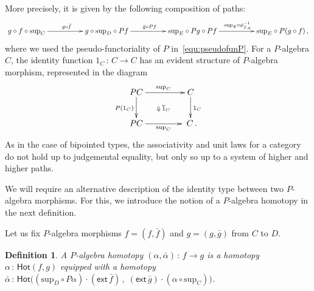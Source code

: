 \documentclass[10pt,a4paper,oneside,reqno]{amsart}
\numberwithin{equation}{section}
\theoremstyle{mythm}
\theoremstyle{mydef}
\newtheorem{definition}[theorem]{Definition}
\theoremstyle{myrmk}
\newcommand{\co}{\,{:}\,}
\newcommand{\ct}{\cdot}
\newcommand{\Hot}{\mathsf{Hot}}
\newcommand{\ext}{\mathsf{ext}}
\renewcommand{\sup}{\mathrm{sup}}
\begin{document}
More precisely, it is given by the following composition of paths:
\[
\xymatrix@C=1.7cm{
g \circ f \circ \sup_C \ar[r]^{g \circ \bar{f}} & 
g \circ \sup_D \circ Pf \ar[r]^{\bar{g} \circ Pf} & 
\sup_E \circ Pg \circ Pf \ar[r]^{\sup_E \circ \phi_{f,g}^{-1}} &
\sup_E \circ P(g \circ f) \, ,}
\]
where we used the pseudo-functoriality of $P$ in~\eqref{equ:pseudofunP}. 
For a $P$-algebra $C$,  the identity function $1_C \co C \to C$ has an evident structure of $P$-algebra morphism,
represented in the diagram
\begin{equation}
\label{equ:palgid}
\xymatrix@C=1.5cm{
PC \ar[d]_{P(1_C)}  \ar[r]^{\sup_C} \ar@{}[dr]|{\Downarrow \, \overline{1}_C} & C \ar[d]^{1_C} \\
PC \ar[r]_{\sup_C} & \; C \, .}
\end{equation}
As in the case of bipointed types, the associativity and unit laws for a category do not hold up to judgemental equality, but only so up to a system of higher and higher paths.

\medskip

We will require an alternative description of the identity type between two $P$-algebra morphisms. For this, we introduce  the notion of a $P$-algebra homotopy in the next definition.

\medskip

Let us fix $P$-algebra morphisms $f = (f, \bar{f})$ and $g =  (g, \bar{g})$ from $C$ to $D$. 



\begin{definition} A \emph{$P$-algebra homotopy}  $(\alpha, \bar{\alpha}) \co f \to g$
is a homotopy $\alpha \co\Hot( f , g)$ equipped with a homotopy
$\bar{\alpha} \co 
\Hot \big(  ( \sup_D \circ P \alpha ) \ct  (\ext \, \bar{f})  \, , \;  (\ext \, \bar{g})  \ct (\alpha \circ \sup_C)\big)$.
\end{definition}
\end{document}
